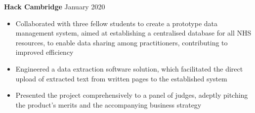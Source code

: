 \documentclass{article}
\begin{document}


\textbf{Hack Cambridge} \hfill January 2020
\begin{itemize}
    \item Collaborated with three fellow students to create a prototype data management system, aimed at establishing a centralised database for all NHS resources, to enable data sharing among practitioners, contributing to improved efficiency
    \item Engineered a data extraction software solution, which facilitated the direct upload of extracted text from written pages to the established system
    \item Presented the project comprehensively to a panel of judges, adeptly pitching the product's merits and the accompanying business strategy
\end{itemize} \medskip
\end{document}
